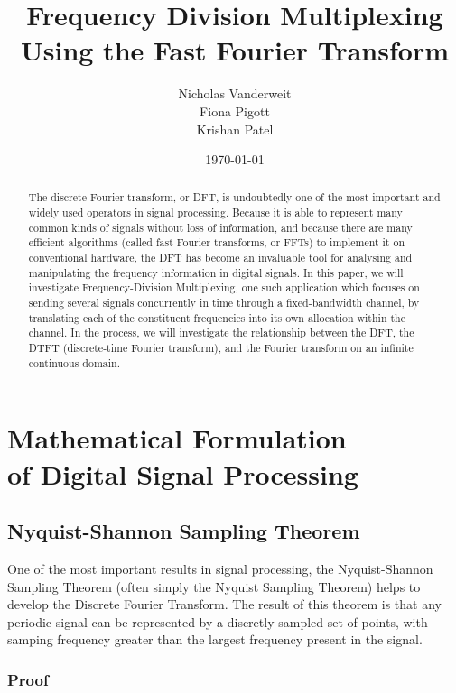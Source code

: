 \documentclass[12pt]{article}
\title{Frequency Division Multiplexing \\Using the Fast Fourier Transform }
\author{Nicholas Vanderweit \\Fiona Pigott \\Krishan Patel}
\date{\today}
\begin{document}
\maketitle


\begin{abstract}

The discrete Fourier transform, or DFT, is undoubtedly one of the most
important and widely used operators in signal processing. Because it is
able to represent many common kinds of signals without loss of information, and
because there are many efficient algorithms (called fast Fourier transforms, or
FFTs) to implement it on conventional hardware, the DFT has become an
invaluable tool for analysing and manipulating the frequency information in
digital signals. In this paper, we will investigate Frequency-Division
Multiplexing, one such application which focuses on sending several signals
concurrently in time through a fixed-bandwidth channel, by translating each of
the constituent frequencies into its own allocation within the channel. In the
process, we will investigate the relationship between the DFT, the DTFT
(discrete-time Fourier transform), and the Fourier transform on an infinite
continuous domain.


\end{abstract}

\clearpage

\section{Mathematical Formulation \\of Digital Signal Processing}

\subsection{Nyquist-Shannon Sampling Theorem}

One of the most important results in signal processing, the Nyquist-Shannon
Sampling Theorem (often simply the Nyquist Sampling Theorem) helps to develop
the Discrete Fourier Transform. The result of this theorem is that any periodic
signal can be represented by a discretly sampled set of points, with samping 
frequency greater than the largest frequency present in the signal. 

\subsubsection{Proof}
\end{document}
